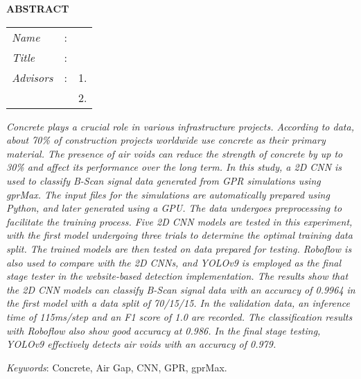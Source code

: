 \begin{center}
  \large\textbf{ABSTRACT}
\end{center}


\vspace{2ex}

\begingroup
\setlength{\tabcolsep}{0pt}

\noindent
\begin{tabularx}{\textwidth}{l >{\centering}m{3em} X}
  \emph{Name}     & : & \name{}         \\

  \emph{Title}    & : & \engtatitle{}   \\

  \emph{Advisors} & : & 1. \advisor{}   \\
                  &   & 2. \coadvisor{} \\
\end{tabularx}
\endgroup

\emph{Concrete plays a crucial role in various infrastructure projects. According to data, about 70\% of construction projects worldwide use concrete as their primary material. The presence of air voids can reduce the strength of concrete by up to 30\% and affect its performance over the long term. In this study, a 2D CNN is used to classify B-Scan signal data generated from GPR simulations using gprMax. The input files for the simulations are automatically prepared using Python, and later generated using a GPU. The data undergoes preprocessing to facilitate the training process. Five 2D CNN models are tested in this experiment, with the first model undergoing three trials to determine the optimal training data split. The trained models are then tested on data prepared for testing. Roboflow is also used to compare with the 2D CNNs, and YOLOv9 is employed as the final stage tester in the website-based detection implementation. The results show that the 2D CNN models can classify B-Scan signal data with an accuracy of 0.9964 in the first model with a data split of 70/15/15. In the validation data, an inference time of 115ms/step and an F1 score of 1.0 are recorded. The classification results with Roboflow also show good accuracy at 0.986. In the final stage testing, YOLOv9 effectively detects air voids with an accuracy of 0.979.}

\emph{Keywords}: Concrete, Air Gap, CNN, GPR, gprMax.
